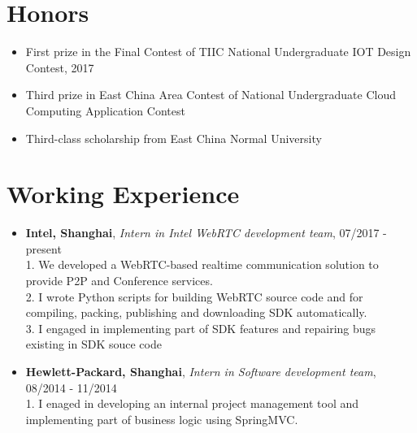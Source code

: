 \documentclass[letterpaper, UTF8]{article}
\begin{document}
	\section*{\textbf{Honors}}\vspace{-0.05in}
	\begin{itemize}
		\item First prize in the Final Contest of TIIC National Undergraduate IOT Design Contest, 2017
		\item Third prize in East China Area Contest of National Undergraduate Cloud Computing Application Contest
		\item Third-class scholarship from East China Normal University
	\end{itemize}
	\vspace{-0.32in}
	
	\section*{\textbf{Working Experience}}\vspace{-0.05in}
	\begin{itemize}
		\item \textbf{Intel, Shanghai}, \emph{Intern in Intel WebRTC development team}, 07/2017 - present  \\
		 1. We developed a WebRTC-based realtime communication solution to provide P2P and Conference services.\\
		 2. I wrote Python scripts for building WebRTC source code and for compiling, packing, publishing and downloading SDK automatically.\\
		 3. I engaged in implementing part of SDK features and repairing bugs existing in SDK souce code
		\item \textbf{Hewlett-Packard, Shanghai}, \emph{Intern in Software development team}, 08/2014 - 11/2014  \\
		 1. I enaged in developing an internal project management tool and implementing part of business logic using SpringMVC.
	\end{itemize}
	\vspace{-0.32in}
	
\end{document}
